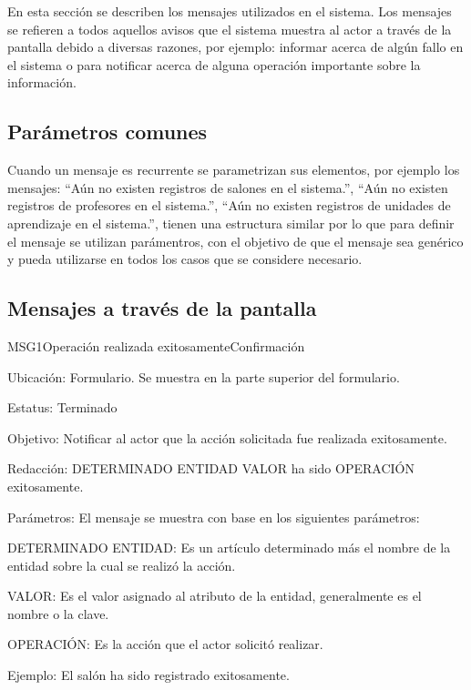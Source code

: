 	En esta sección se describen los mensajes utilizados en el sistema. Los mensajes se refieren a todos
	aquellos avisos que el sistema muestra al actor a través de la pantalla debido a diversas
	razones, por ejemplo: informar acerca de algún fallo en el sistema o para notificar acerca de alguna operación importante sobre la información.

\subsection{Parámetros comunes}
    Cuando un mensaje es recurrente se parametrizan sus elementos, por ejemplo los mensajes: ``Aún no existen registros de salones en el sistema.'', ``Aún no existen registros de profesores en el sistema.'', 
    ``Aún no existen registros de unidades de aprendizaje en el sistema.'', tienen una estructura similar 
    por lo que para definir el mensaje se utilizan parámentros, con el objetivo de que el mensaje sea genérico y  
    pueda utilizarse en todos los casos que se considere necesario.\\

\subsection{Mensajes a través de la pantalla}

\begin{mensaje}{MSG1}{Operación realizada exitosamente}{Confirmación}
    \item[Ubicación:] Formulario. Se muestra en la parte superior del formulario.
    \item[Estatus:] Terminado
    \item[Objetivo:] Notificar al actor que la acción solicitada fue realizada exitosamente.
    \item[Redacción:] DETERMINADO ENTIDAD VALOR ha sido OPERACIÓN exitosamente.
    \item[Parámetros:] El mensaje se muestra con base en los siguientes parámetros:
    \begin{Citemize}
	\item DETERMINADO ENTIDAD: Es un artículo determinado más el nombre de la entidad sobre la cual se realizó la acción.
	\item VALOR: Es el valor asignado al atributo de la entidad, generalmente es el nombre o la clave.
	\item OPERACIÓN: Es la acción que el actor solicitó realizar.
    \end{Citemize}
    \item[Ejemplo:] El salón ha sido registrado exitosamente.
\end{mensaje}

